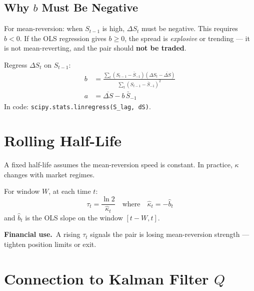 \documentclass[10pt,a4paper,twocolumn]{article}
\begin{document}
\subsection{Why $b$ Must Be Negative}

For mean-reversion: when $S_{t-1}$ is high, $\Delta S_t$ must be negative.
This requires $b < 0$.  If the OLS regression gives $b \geq 0$, the spread
is \emph{explosive} or trending --- it is not mean-reverting, and the
pair should \textbf{not be traded}.

\begin{tcolorbox}[mathbox={Formula 5 --- OLS Estimation}]
\vspace{-4pt}
Regress $\Delta S_t$ on $S_{t-1}$:
\begin{align}
  b &= \frac{\sum_t (S_{t-1}-\bar{S}_{-1})(\Delta S_t - \overline{\Delta S})}
           {\sum_t (S_{t-1}-\bar{S}_{-1})^2} \\
  a &= \overline{\Delta S} - b\,\bar{S}_{-1}
\end{align}
\vspace{-2pt}
In code: \texttt{scipy.stats.linregress(S\_lag, dS)}.
\end{tcolorbox}

\section{Rolling Half-Life}

A fixed half-life assumes the mean-reversion speed is constant.
In practice, $\kappa$ changes with market regimes.

\begin{tcolorbox}[mathbox={Formula 6 --- Rolling Half-Life}]
\vspace{-4pt}
For window $W$, at each time $t$:
\begin{equation}
  \tau_t = \frac{\ln 2}{\hat\kappa_t}
  \quad\text{where}\quad
  \hat\kappa_t = -\hat b_t
\end{equation}
and $\hat b_t$ is the OLS slope on the window $[t-W, t]$.
\end{tcolorbox}

\noindent\textbf{Financial use.}~A rising $\tau_t$ signals the pair is
losing mean-reversion strength --- tighten position limits or exit.

\section{Connection to Kalman Filter $Q$}
\end{document}
